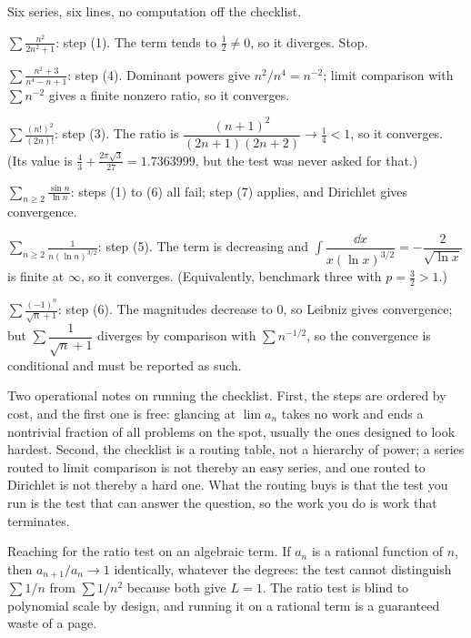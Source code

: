 \begin{worked}
Six series, six lines, no computation off the checklist.

$\displaystyle\sum\frac{n^2}{2n^2+1}$: step (1). The term tends to $\tfrac12\neq0$, so it diverges. Stop.

$\displaystyle\sum\frac{n^2+3}{n^4-n+1}$: step (4). Dominant powers give $n^2/n^4=n^{-2}$; limit comparison with $\sum n^{-2}$ gives a finite nonzero ratio, so it converges.

$\displaystyle\sum\frac{(n!)^2}{(2n)!}$: step (3). The ratio is $\dfrac{(n+1)^2}{(2n+1)(2n+2)}\to\tfrac14<1$, so it converges. (Its value is $\tfrac43+\tfrac{2\pi\sqrt3}{27}=1.7363999$, but the test was never asked for that.)

$\displaystyle\sum_{n\geq2}\frac{\sin n}{\ln n}$: steps (1) to (6) all fail; step (7) applies, and Dirichlet gives convergence.

$\displaystyle\sum_{n\geq2}\frac{1}{n(\ln n)^{3/2}}$: step (5). The term is decreasing and $\int\dfrac{\dd x}{x(\ln x)^{3/2}}=-\dfrac{2}{\sqrt{\ln x}}$ is finite at $\infty$, so it converges. (Equivalently, benchmark three with $p=\tfrac32>1$.)

$\displaystyle\sum\frac{(-1)^{n}}{\sqrt{n}+1}$: step (6). The magnitudes decrease to $0$, so Leibniz gives convergence; but $\sum\dfrac{1}{\sqrt n+1}$ diverges by comparison with $\sum n^{-1/2}$, so the convergence is conditional and must be reported as such.
\end{worked}

Two operational notes on running the checklist. First, the steps are ordered by cost, and the first one is free: glancing at $\lim a_n$ takes no work and ends a nontrivial fraction of all problems on the spot, usually the ones designed to look hardest. Second, the checklist is a routing table, not a hierarchy of power; a series routed to limit comparison is not thereby an easy series, and one routed to Dirichlet is not thereby a hard one. What the routing buys is that the test you run is the test that can answer the question, so the work you do is work that terminates.

\begin{trap}
Reaching for the ratio test on an algebraic term. If $a_n$ is a rational function of $n$, then $a_{n+1}/a_n\to1$ identically, whatever the degrees: the test cannot distinguish $\sum1/n$ from $\sum1/n^2$ because both give $L=1$. The ratio test is blind to polynomial scale by design, and running it on a rational term is a guaranteed waste of a page.
\end{trap}

